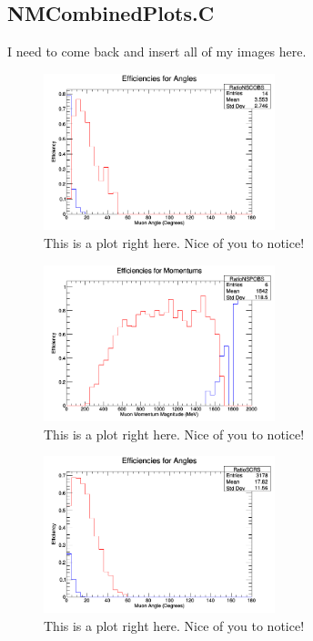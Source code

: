 \documentclass[11pt]{article}
\begin{document}
\subsection{NMCombinedPlots.C}
I need to come back and insert all of my images here.

\begin{figure}[H]
\centering
\includegraphics[width=0.6\textwidth]{NMCombinedPlotsImages/1-NMCombinedPlots.png}
\caption{This is a plot right here. Nice of you to notice!}
\end{figure}

\begin{figure}[H]
\centering
\includegraphics[width=0.6\textwidth]{NMCombinedPlotsImages/2-NMCombinedPlots.png}
\caption{This is a plot right here. Nice of you to notice!}
\end{figure}

\begin{figure}[H]
\centering
\includegraphics[width=0.6\textwidth]{NMCombinedPlotsImages/3-NMCombinedPlots.png}
\caption{This is a plot right here. Nice of you to notice!}
\end{figure}
\end{document}
